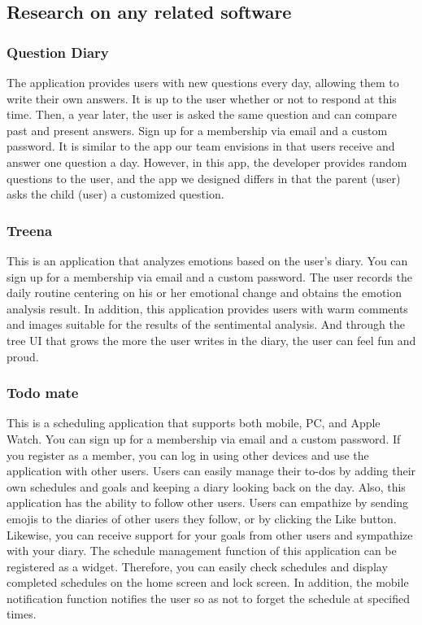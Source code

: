 \documentclass[conference]{IEEEtran}
\begin{document}
\subsection{\large{Research on any related software}}

\subsubsection{Question Diary}

The application provides users with new questions every day, allowing them to write their own answers. It is up to the user whether or not to respond at this time. Then, a year later, the user is asked the same question and can compare past and present answers. Sign up for a membership via email and a custom password. It is similar to the app our team envisions in that users receive and answer one question a day. However, in this app, the developer provides random questions to the user, and the app we designed differs in that the parent (user) asks the child (user) a customized question.

\subsubsection{Treena}

This is an application that analyzes emotions based on the user's diary. You can sign up for a membership via email and a custom password. The user records the daily routine centering on his or her emotional change and obtains the emotion analysis result. In addition, this application provides users with warm comments and images suitable for the results of the sentimental analysis. And through the tree UI that grows the more the user writes in the diary, the user can feel fun and proud.

\subsubsection{Todo mate}

This is a scheduling application that supports both mobile, PC, and Apple Watch. You can sign up for a membership via email and a custom password. If you register as a member, you can log in using other devices and use the application with other users. Users can easily manage their to-dos by adding their own schedules and goals and keeping a diary looking back on the day. Also, this application has the ability to follow other users. Users can empathize by sending emojis to the diaries of other users they follow, or by clicking the Like button. Likewise, you can receive support for your goals from other users and sympathize with your diary. The schedule management function of this application can be registered as a widget. Therefore, you can easily check schedules and display completed schedules on the home screen and lock screen. In addition, the mobile notification function notifies the user so as not to forget the schedule at specified times.
\end{document}
